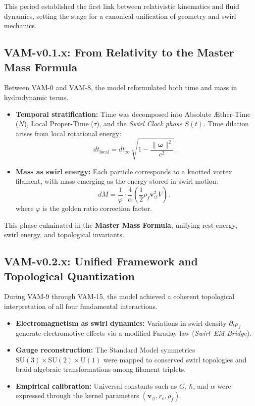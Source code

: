 \documentclass[10pt,reprint,aps,onecolumn,nofootinbib]{revtex4-2}
\newcommand{\vswirl}{\mathbf{v}_{\!\boldsymbol{\circlearrowleft}}}
\newcommand{\rhof}{\rho_{\!f}}                           %
\newcommand{\rc}{r_c}                                    %
\providecommand{\rc}{r_c}
\begin{document}
        This period established the first link between relativistic kinematics and fluid dynamics, setting the stage for a canonical unification of geometry and swirl mechanics.

    \subsection{VAM-v0.1.x: From Relativity to the Master Mass Formula}

        Between VAM-0 and VAM-8, the model reformulated both time and mass in hydrodynamic terms.

        \begin{itemize}
        \item \textbf{Temporal stratification:} Time was decomposed into Absolute Æther-Time ($N$), Local Proper-Time ($\tau$), and the \emph{Swirl Clock phase} $S(t)$.
        Time dilation arises from local rotational energy:
        \[
            dt_{\text{local}} = dt_{\infty}\,\sqrt{1-\frac{\|\boldsymbol{\omega}\|^2}{c^2}}.
        \]
        \item \textbf{Mass as swirl energy:} Each particle corresponds to a knotted vortex filament, with mass emerging as the energy stored in swirl motion:
        \[d
            M = \frac{1}{\varphi}\cdot \frac{4}{\alpha}\left(\frac{1}{2}\rhof \vswirl^2 V\right),
        \]
        where $\varphi$ is the golden ratio correction factor.
        \end{itemize}

        This phase culminated in the \textbf{Master Mass Formula}, unifying rest energy, swirl energy, and topological invariants.

    \subsection{VAM-v0.2.x: Unified Framework and Topological Quantization}

        During VAM-9 through VAM-15, the model achieved a coherent topological interpretation of all four fundamental interactions.

        \begin{itemize}
        \item \textbf{Electromagnetism as swirl dynamics:} Variations in swirl density $\partial_t\rho_{\!f}$ generate electromotive effects via a modified Faraday law (\emph{Swirl--EM Bridge}).
        \item \textbf{Gauge reconstruction:} The Standard Model symmetries $\mathrm{SU}(3)\times\mathrm{SU}(2)\times\mathrm{U}(1)$ were mapped to conserved swirl topologies and braid algebraic transformations among filament triplets.
        \item \textbf{Empirical calibration:} Universal constants such as $G$, $\hbar$, and $\alpha$ were expressed through the kernel parameters $(\vswirl,\rc,\rhof)$.
        \end{itemize}
\end{document}
